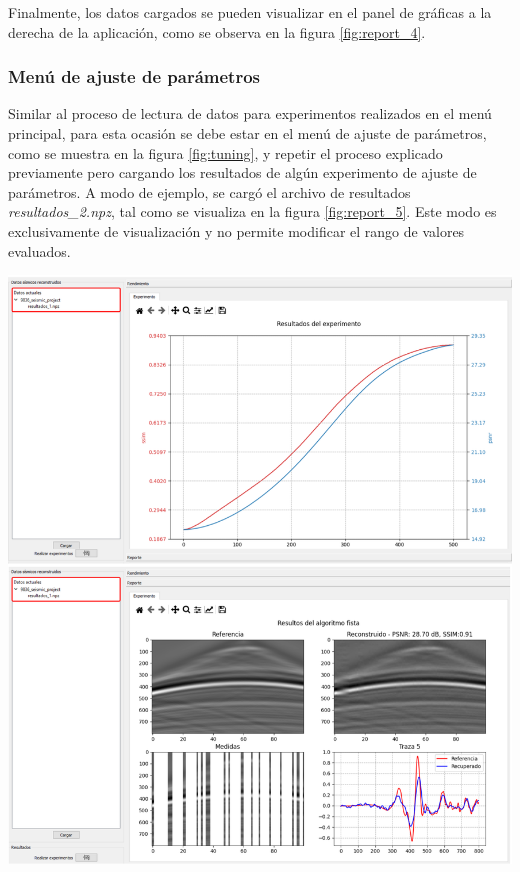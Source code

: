 \documentclass[12pt,twoside,letter]{ol-softwaremanual}
\newenvironment{Figure}
  {\par\medskip\noindent\minipage{\linewidth}}
  {\endminipage\par\medskip}
\begin{document}
Finalmente, los datos cargados se pueden visualizar en el panel de gráficas a la derecha de la aplicación, como se observa en la figura \ref{fig:report_4}.

\subsubsection{Menú de ajuste de parámetros}

Similar al proceso de lectura de datos para experimentos realizados en el menú principal, para esta ocasión se debe estar en el menú de ajuste de parámetros, como se muestra en la figura \ref{fig:tuning}, y repetir el proceso explicado previamente pero cargando los resultados de algún experimento de ajuste de parámetros. A modo de ejemplo, se cargó el archivo de resultados \emph{resultados\_2.npz}, tal como se visualiza en la figura \ref{fig:report_5}. Este modo es exclusivamente de visualización y no permite modificar el rango de valores evaluados.

\begin{Figure}
    \centering
    \includegraphics[width=1\linewidth]{report-4.png}
    \label{fig:report_4}
\end{Figure}
\end{document}
